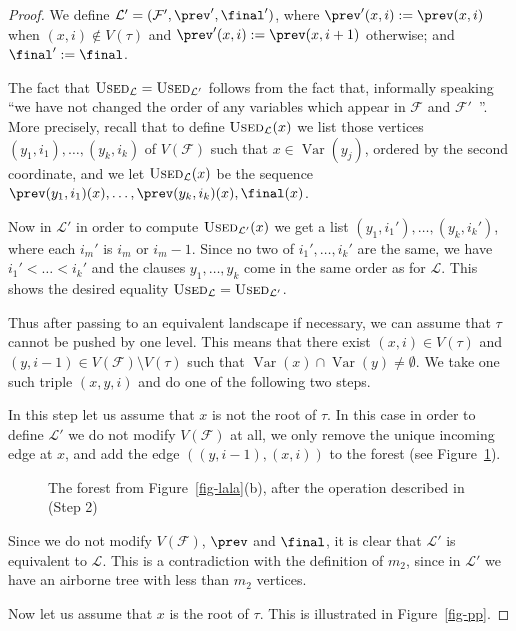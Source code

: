 \documentclass[12pt,a4paper]{article}
\numberwithin{equation}{section}
\theoremstyle{definition}
\renewcommand{\cal}[1]{{\mathcal #1}}
\newcommand\Var{\operatorname{Var}}
\newcommand{\used}{\textsc{Used}}
\begin{document}
\begin{proof}
    We define $\cal L'=(\cal F',\prev',\final')$, where $\prev'(x,i):=\prev(x,i)$ when $(x,i) \notin V(\tau)$ and $\prev'(x,i):= \prev(x,i+1)$ otherwise; and $\final':=\final$. 
    
    The fact that $\used_{\cal L} = \used_{\cal L'}$ follows from the fact that, informally speaking ``we have not changed the order of any variables which appear in $\cal F$ and $\cal F'$\, ''. More precisely, recall that to define $\used_{\cal L}(x)$ we list those  vertices  $(y_1,i_1),\ldots, (y_k,i_k)$  of $V(\cal F)$  such that $x\in \Var(y_j)$, ordered by the second coordinate, and we let $\used_{\cal L}(x)$ be the sequence $\prev(y_1,i_1)(x),\ldots, \prev(y_k,i_k)(x),\final(x)$. 
    
    Now in $\cal L'$ in order to compute $\used_{\cal L'}(x)$ we get a list $(y_1, i_1'),\ldots, (y_k,i_k')$, where each $i_m'$ is $i_m$ or $i_m-1$. Since no two of $i_1',\dots,i_k'$ are the same, we have $i_1'<\ldots < i_k'$ and the clauses $y_1,\dots,y_k$ come in the same order as for $\cal L$. This shows the desired equality $\used_{\cal L} = \used_{\cal L'}$.
    
    Thus after passing to an equivalent landscape if necessary, we can assume that $\tau$ cannot be pushed by one level. This means that there exist $(x,i)\in V(\tau)$ and $(y,i-1)\in V(\cal F)\setminus V(\tau)$ such that $\Var(x)\cap \Var(y)\neq \emptyset$. We take one such triple $(x,y,i)$ and do one of the following two steps.
    
    \item[\textbf{(Step 2)}] In this step let us assume that $x$ is not the root of $\tau$. In this case in order to define $\cal L'$ we do not modify $V(\cal F)$ at all, we only remove the unique incoming edge at $x$, and add the edge $((y,i-1), (x,i))$ to the forest (see Figure~\ref{fig-wew}).
    
    \begin{figure}[h]
    \centering
    \scalebox{0.4}{}
    \caption{The forest from Figure~\ref{fig-lala}(b), after the operation described in (Step 2)} 
    \label{fig-wew}
    \end{figure}
    Since we do not modify $V(\cal F)$, $\prev$ and $\final$, it is clear that $\cal L'$ is equivalent to $\cal L$. This is a contradiction with the definition of $m_2$, since in $\cal L'$ we have an airborne tree with less than $m_2$ vertices.
    
    \item[\textbf{(Step 3)}] Now let us assume that $x$ is the root of $\tau$. This is illustrated in Figure~\ref{fig-pp}.
    

\end{proof}
\end{document}
